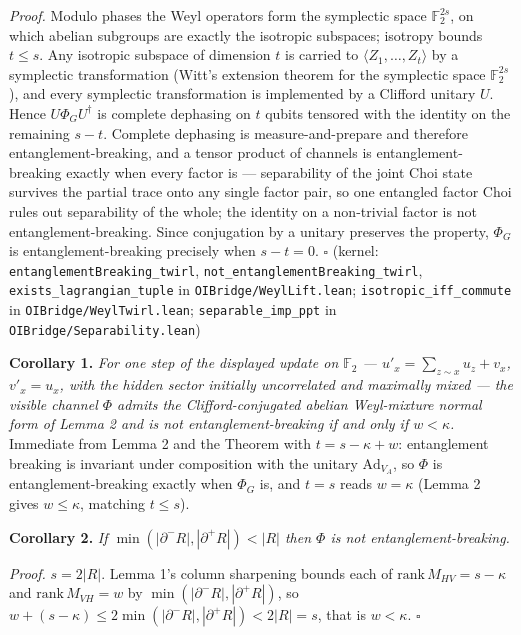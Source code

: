 \documentclass[
]{article}
\begin{document}
\emph{Proof.} Modulo phases the Weyl operators form the symplectic space
\(\mathbb{F}_2^{2s}\), on which abelian subgroups are exactly the
isotropic subspaces; isotropy bounds \(t \leq s\). Any isotropic
subspace of dimension \(t\) is carried to
\(\langle Z_1, \dots, Z_t \rangle\) by a symplectic transformation
(Witt's extension theorem for the symplectic space
\(\mathbb{F}_2^{2s}\)), and every symplectic transformation is
implemented by a Clifford unitary \(U\). Hence \(U \Phi_G U^{\dagger}\)
is complete dephasing on \(t\) qubits tensored with the identity on the
remaining \(s - t\). Complete dephasing is measure-and-prepare and
therefore entanglement-breaking, and a tensor product of channels is
entanglement-breaking exactly when every factor is --- separability of
the joint Choi state survives the partial trace onto any single factor
pair, so one entangled factor Choi rules out separability of the whole;
the identity on a non-trivial factor is not entanglement-breaking. Since
conjugation by a unitary preserves the property, \(\Phi_G\) is
entanglement-breaking precisely when \(s - t = 0\). \(\square\) (kernel:
\texttt{entanglementBreaking\_twirl},
\texttt{not\_entanglementBreaking\_twirl},
\texttt{exists\_lagrangian\_tuple} in \texttt{OIBridge/WeylLift.lean};
\texttt{isotropic\_iff\_commute} in \texttt{OIBridge/WeylTwirl.lean};
\texttt{separable\_imp\_ppt} in \texttt{OIBridge/Separability.lean})

\textbf{Corollary 1.} \emph{For one step of the displayed update on
\(\mathbb{F}_2\) --- \(u'_x = \sum_{z \sim x} u_z + v_x\),
\(v'_x = u_x\), with the hidden sector initially uncorrelated and
maximally mixed --- the visible channel \(\Phi\) admits the
Clifford-conjugated abelian Weyl-mixture normal form of Lemma 2 and is
not entanglement-breaking if and only if \(w < \kappa\).} Immediate from
Lemma 2 and the Theorem with \(t = s - \kappa + w\): entanglement
breaking is invariant under composition with the unitary
\(\mathrm{Ad}_{V_A}\), so \(\Phi\) is entanglement-breaking exactly when
\(\Phi_G\) is, and \(t = s\) reads \(w = \kappa\) (Lemma 2 gives
\(w \leq \kappa\), matching \(t \leq s\)).

\textbf{Corollary 2.} \emph{If
\(\min(|\partial^{-}R|, |\partial^{+}R|) < |R|\) then \(\Phi\) is not
entanglement-breaking.}

\emph{Proof.} \(s = 2|R|\). Lemma 1's column sharpening bounds each of
\(\mathrm{rank}\, M_{HV} = s - \kappa\) and
\(\mathrm{rank}\, M_{VH} = w\) by
\(\min(|\partial^{-}R|, |\partial^{+}R|)\), so
\(w + (s - \kappa) \leq 2\min(|\partial^{-}R|, |\partial^{+}R|) < 2|R| = s\),
that is \(w < \kappa\). \(\square\)
\end{document}
